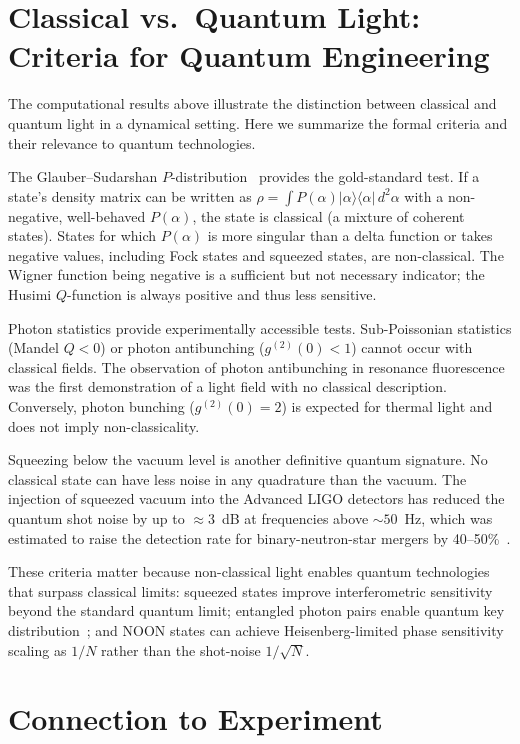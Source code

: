 \documentclass{iopjournal}
\begin{document}
\section{Classical vs.\ Quantum Light: Criteria for Quantum Engineering}
\label{sec:criteria}

The computational results above illustrate the distinction between classical and quantum light in a dynamical setting. Here we summarize the formal criteria and their relevance to quantum technologies.

The Glauber--Sudarshan $P$-distribution~\cite{glauber1963, sudarshan1963} provides the gold-standard test. If a state's density matrix can be written as $\rho = \int P(\alpha) |\alpha\rangle\langle\alpha|\,d^2\alpha$ with a non-negative, well-behaved $P(\alpha)$, the state is classical (a mixture of coherent states). States for which $P(\alpha)$ is more singular than a delta function or takes negative values, including Fock states and squeezed states, are non-classical. The Wigner function being negative is a sufficient but not necessary indicator; the Husimi $Q$-function is always positive and thus less sensitive.

Photon statistics provide experimentally accessible tests. Sub-Poissonian statistics (Mandel $Q < 0$) or photon antibunching ($g^{(2)}(0) < 1$) cannot occur with classical fields. The observation of photon antibunching in resonance fluorescence~\cite{kimble1977} was the first demonstration of a light field with no classical description. Conversely, photon bunching ($g^{(2)}(0) = 2$) is expected for thermal light and does not imply non-classicality.

Squeezing below the vacuum level is another definitive quantum signature. No classical state can have less noise in any quadrature than the vacuum. The injection of squeezed vacuum into the Advanced LIGO detectors has reduced the quantum shot noise by up to $\approx 3$~dB at frequencies above $\sim 50$~Hz, which was estimated to raise the detection rate for binary-neutron-star mergers by 40--50\%~\cite{tse2019}.

These criteria matter because non-classical light enables quantum technologies that surpass classical limits: squeezed states improve interferometric sensitivity beyond the standard quantum limit; entangled photon pairs enable quantum key distribution~\cite{ekert1991}; and NOON states can achieve Heisenberg-limited phase sensitivity scaling as $1/N$ rather than the shot-noise $1/\sqrt{N}$.


\section{Connection to Experiment}
\label{sec:experiment}
\end{document}
